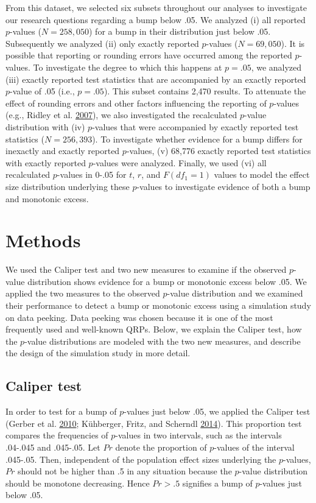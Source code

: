 \documentclass[a5paper]{book}
\begin{document}
From this dataset, we selected six subsets throughout our analyses to
investigate our research questions regarding a bump below .05. We
analyzed (i) all reported \(p\)-values (\(N=258,050\)) for a bump in
their distribution just below .05. Subsequently we analyzed (ii) only
exactly reported \(p\)-values (\(N=69,050\)). It is possible that
reporting or rounding errors have occurred among the reported
\(p\)-values. To investigate the degree to which this happens at
\(p=.05\), we analyzed (iii) exactly reported test statistics that are
accompanied by an exactly reported \(p\)-value of .05 (i.e., \(p=.05\)).
This subset contains 2,470 results. To attenuate the effect of rounding
errors and other factors influencing the reporting of \(p\)-values
(e.g., Ridley et al.
\protect\hyperlink{ref-doi:10.1111ux2fj.1420-9101.2006.01291.x}{2007}),
we also investigated the recalculated \(p\)-value distribution with (iv)
\(p\)-values that were accompanied by exactly reported test statistics
(\(N=256,393\)). To investigate whether evidence for a bump differs for
inexactly and exactly reported \(p\)-values, (v) 68,776 exactly reported
test statistics with exactly reported \(p\)-values were analyzed.
Finally, we used (vi) all recalculated \(p\)-values in 0-.05 for \(t\),
\(r\), and \(F(df_1=1)\) values to model the effect size distribution
underlying these \(p\)-values to investigate evidence of both a bump and
monotonic excess.

\section{Methods}\label{methods}

We used the Caliper test and two new measures to examine if the observed
\(p\)-value distribution shows evidence for a bump or monotonic excess
below .05. We applied the two measures to the observed \(p\)-value
distribution and we examined their performance to detect a bump or
monotonic excess using a simulation study on data peeking. Data peeking
was chosen because it is one of the most frequently used and well-known
QRPs. Below, we explain the Caliper test, how the \(p\)-value
distributions are modeled with the two new measures, and describe the
design of the simulation study in more detail.

\subsection{Caliper test}\label{caliper-test}

In order to test for a bump of \(p\)-values just below .05, we applied
the Caliper test (Gerber et al.
\protect\hyperlink{ref-doi:10.1177ux2f1532673x09350979}{2010};
Kühberger, Fritz, and Scherndl
\protect\hyperlink{ref-doi:10.1371ux2fjournal.pone.0105825}{2014}). This
proportion test compares the frequencies of \(p\)-values in two
intervals, such as the intervals .04-.045 and .045-.05. Let \(Pr\)
denote the proportion of \(p\)-values of the interval .045-.05. Then,
independent of the population effect sizes underlying the \(p\)-values,
\(Pr\) should not be higher than .5 in any situation because the
\(p\)-value distribution should be monotone decreasing. Hence \(Pr>.5\)
signifies a bump of \(p\)-values just below .05.
\end{document}
